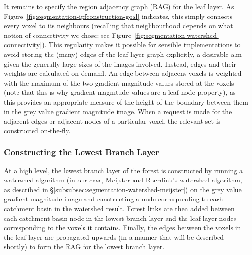 It remains to specify the region adjacency graph (RAG) for the leaf layer. As Figure~\ref{fig:segmentation-ipfconstruction-goal} indicates, this simply connects every voxel to its neighbours (recalling that neighbourhood depends on what notion of connectivity we chose: see Figure~\ref{fig:segmentation-watershed-connectivity}). This regularity makes it possible for sensible implementations to avoid storing the (many) edges of the leaf layer graph explicitly, a desirable aim given the generally large sizes of the images involved. Instead, edges and their weights are calculated on demand. An edge between adjacent voxels is weighted with the maximum of the two gradient magnitude values stored at the voxels (note that this is why gradient magnitude values are a leaf node property), as this provides an appropriate measure of the height of the boundary between them in the grey value gradient magnitude image. When a request is made for the adjacent edges or adjacent nodes of a particular voxel, the relevant set is constructed on-the-fly.

\subsubsection{Constructing the Lowest Branch Layer}

At a high level, the lowest branch layer of the forest is constructed by running a watershed algorithm (in our case, Meijster and Roerdink's watershed algorithm, as described in \S\ref{subsubsec:segmentation-watershed-meijster}) on the grey value gradient magnitude image and constructing a node corresponding to each catchment basin in the watershed result. Forest links are then added between each catchment basin node in the lowest branch layer and the leaf layer nodes corresponding to the voxels it contains. Finally, the edges between the voxels in the leaf layer are propagated upwards (in a manner that will be described shortly) to form the RAG for the lowest branch layer.

